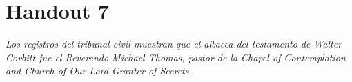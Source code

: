 \chapter{Handout 7}

\emph{Los registros del tribunal civil muestran que el albacea del testamento de Walter Corbitt fue el Reverendo Michael Thomas, pastor de la \emph{Chapel of
Contemplation and Church of Our Lord Granter of Secrets}.}


